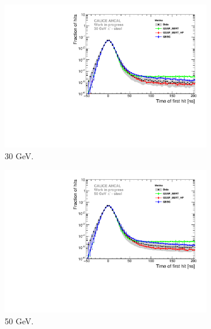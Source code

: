 \documentclass{JINST}
\begin{document}
\begin{figure}[htbp!]
  \begin{subfigure}[t]{0.49\textwidth}
    \centering
    \includegraphics[width=1\textwidth]{fig/Comparison_SimData_Pion30GeV_LateClusters.pdf}
    \caption{30 GeV.}\label{fig:dNdt_SimData_30GeV}
  \end{subfigure}
  \begin{subfigure}[t]{0.49\textwidth}
    \centering
    \includegraphics[width=1\textwidth]{fig/Comparison_SimData_Pion50GeV_LateClusters.pdf}
    \caption{50 GeV.} \label{fig:dNdt_SimData_50GeV}
  \end{subfigure}
  \hfill
  \begin{subfigure}[t]{0.49\textwidth}
    \centering

\end{subfigure}
\end{figure}
\end{document}
